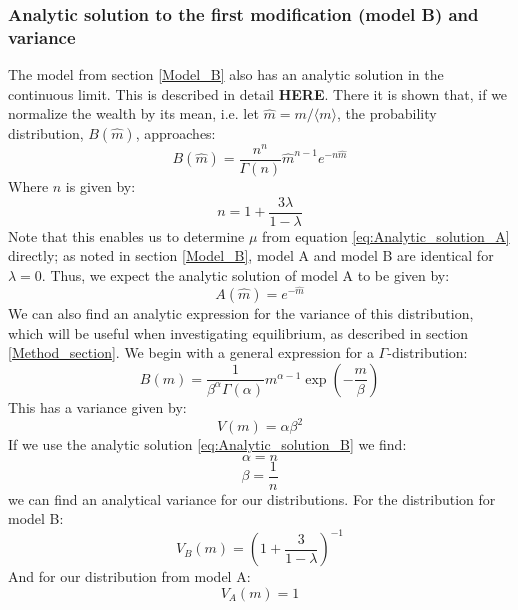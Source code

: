 \documentclass[a4paper, 10pt]{article}
\begin{document}
\subsubsection{Analytic solution to the first modification (model B) and variance}
The model from section \ref{Model_B} also has an analytic solution in the continuous limit. This is described in detail \textbf{HERE}. There it is shown that, if we normalize the wealth by its mean, i.e. let $\hat{m}=m/\langle m \rangle$, the probability distribution, $B(\hat{m})$, approaches:
\begin{equation}\label{eq:Analytic_solution_B}
B(\hat{m})=\frac{n^n}{\Gamma(n)}\hat{m}^{n-1}e^{-n\hat{m}}
\end{equation}
Where $n$ is given by:
$$n=1+\frac{3\lambda}{1-\lambda}$$
Note that this enables us to determine $\mu$ from equation \ref{eq:Analytic_solution_A} directly; as noted in section \ref{Model_B}, model A and model B are identical for $\lambda = 0$. Thus, we expect the analytic solution of model A to be given by:
\begin{equation}
A(\hat{m})=e^{-\hat{m}}
\end{equation}
We can also find an analytic expression for the variance of this distribution, which will be useful when investigating equilibrium, as described in section \ref{Method_section}. We begin with a general expression for a $\Gamma$-distribution:
\begin{equation}
B(m) = \frac{1}{\beta^{\alpha}\Gamma(\alpha)}m^{\alpha - 1}\exp\left(-\frac{m}{\beta}\right)
\end{equation}
This has a variance given by: 
\begin{equation}
V(m) = \alpha \beta^2
\end{equation}
If we use the analytic solution \ref{eq:Analytic_solution_B} we find:
\begin{equation}
\alpha = n
\end{equation}
\begin{equation}
\beta = \frac{1}{n}
\end{equation}
we can find an analytical variance for our distributions. For the distribution for model B:
\begin{equation}
V_B(m) = \left( 1 + \frac{3}{1-\lambda} \right) ^{-1}
\end{equation}
And for our distribution from model A:
\begin{equation}
V_A(m)=1
\end{equation}
\end{document}
